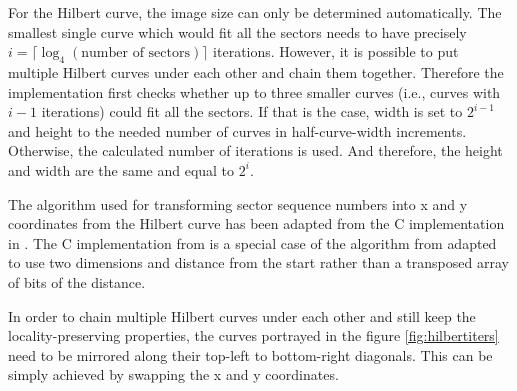 \documentclass[
  digital, %
  color,   %
  oneside, %
  lof,     %
  nolot,     %
]{fithesis4}
\begin{document}
For the Hilbert curve, the image size can only be determined automatically.
The smallest single curve which would fit all the sectors needs to have precisely $i = \lceil\log_4(\text{number of sectors})\rceil$ iterations.
However, it is possible to put multiple Hilbert curves under each other and chain them together.
Therefore the implementation first checks whether up to three smaller curves (i.e., curves with $i - 1$ iterations) could fit all the sectors.
If that is the case, width is set to $2^{i - 1}$ and height to the needed number of curves in half-curve-width increments.
Otherwise, the calculated number of iterations is used.
And therefore, the height and width are the same and equal to $2^i$.

The algorithm used for transforming sector sequence numbers into x and y coordinates from the Hilbert curve has been adapted from the C implementation in \cite{wikihilbert}.
The C implementation from \cite{wikihilbert} is a special case of the algorithm from \cite{skilling04} adapted to use two dimensions and distance from the start rather than a transposed array of bits of the distance.


In order to chain multiple Hilbert curves under each other and still keep the locality-preserving properties, the curves portrayed in the figure \ref{fig:hilbertiters} need to be mirrored along their top-left to bottom-right diagonals.
This can be simply achieved by swapping the x and y coordinates.
\end{document}
